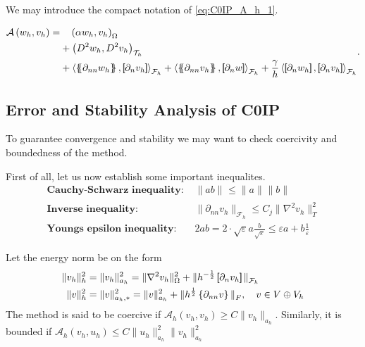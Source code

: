 We may introduce the compact notation of \eqref{eq:C0IP_A_h_1}.

\begin{equation}
\label{eq:C0IP_A_h}
\begin{split}
\mathcal{A} \left( w_{h}, v_{h} \right)   =&
  \quad  \left( \alpha  w_{h}, v_{h} \right) _{\Omega }\\
&  +  \left( D^2 w_{h}, D^2v_{h} \right) _{\mathcal{T} _{h}} \\
 & +
  \left< \mean{  \partial _{n n} w_{h} }, \jump{ \partial _{n }v_{h}} \right>_{\mathcal{F}_{h}}  +
 \left< \mean{ \partial _{n n} v_{h} }, \jump{ \partial _{n}w }      \right>_{\mathcal{F}_{h}}
+ \frac{\gamma }{h}  \left< \jump{ \partial _{n} w_{h}}, \jump{ \partial _{n} v_{h}   }   \right>_{\mathcal{F}_{h}}
\end{split}
.\end{equation}

\subsection{Error and Stability Analysis of C0IP}%
\label{sub:error_and_stability_analysis_of_c0ip}

To guarantee convergence and stability we may want to check coercivity and boundedness of the method.

First of all, let us now establish some important inequalites.
\[
\begin{split}
    \textbf{Cauchy-Schwarz inequality: } & \| ab \|_{  }^{  }  \le \| a \|_{  }^{  } \| b \|_{  }^{  }   \\
    \textbf{Inverse inequality: } & \| \partial _{nn}  v_{h} \|_{\mathcal{F}_{h}   }^{  }  \le C_{j} \| \nabla ^2 v_{h} \|_{ T }^{ 2 }   \\
    \textbf{Youngs epsilon inequality: } & 2ab = 2\cdot  \sqrt{\varepsilon }a   \frac{b}{\sqrt{\varepsilon } } \le \varepsilon a+ b \frac{1}{\varepsilon }
\end{split}
\]

Let the energy norm be on the form \[
    \begin{split}
\| v_{h} \|_{ h }^{2  } & = \| v_{h} \|_{ a_{h} }^{ 2 } = \| \nabla ^2 v_{h} \|_{ \Omega  }^{ 2 }  + \|  h^{-\frac{1}{2}} \left[\!\!\left[  \partial _{n} v_{h}     \right]\!\!\right]\|_{  \mathcal{F} _{h} }^{  } \\
\| v \|_{ h }^{ 2 }  &= \| v \|_{ a_{h},* }^{ 2 } = \| v \|_{ a_{h} }^{ 2 }  + \| h^{\frac{1}{2}} \left\{ \partial _{nn } v\right\}  \|_{ F  }^{  }, \quad  v\in V \oplus V_{h}
    \end{split}
\]
The method is said to be coercive if $\mathcal{A} _{h}\left( v_{h}, v_{h} \right) \ge  C \| v_{h} \|_{ a_{h} }^{  } $. Similarly, it is bounded if $ \mathcal{A} _{h} \left( v_{h}, u_{h} \right) \le  C \| u_{h} \|_{  a_{h}}^{ 2 }  \| v_{h} \|_{ a_{h}
}^{ 2 } $

